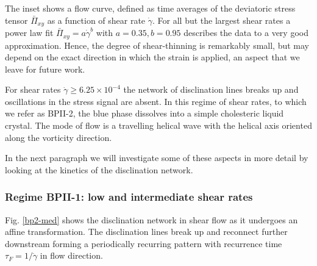 \documentclass[aps,pre,reprint,superscriptaddress, twocolumn]{revtex4}
\newcommand{\e}[1]{\times10^{#1}}
\newcommand{\gd}{\dot{\gamma}}
\begin{document}
The inset shows a flow curve, defined as time averages of 
the deviatoric stress tensor $\bar{\Pi}_{xy}$ as a function of shear rate $\gd$.
For all but the largest shear rates a power law fit $\bar{\Pi}_{xy}=a \gd^b$ with 
$a=0.35, b=0.95$ describes the data to a very good approximation. 
Hence, the degree of shear-thinning is remarkably small, but may depend
on the exact direction in which the strain is applied, an aspect that we     
leave for future work.

For shear rates $\gd\ge6.25\e{-4}$ the network of disclination lines
breaks up and oscillations in the stress signal are absent.
In this regime of shear rates, to which we refer as BPII-2, the 
blue phase dissolves into a simple cholesteric liquid 
crystal. The mode of flow is a travelling helical wave with the helical axis 
oriented along the vorticity direction.

In the next paragraph we will investigate some of these aspects in more detail 
by looking at the kinetics of the disclination network.

\subsubsection{Regime BPII-1: low and intermediate shear rates}

Fig. \ref{bp2-med} shows the disclination network in shear flow as
it undergoes an affine transformation. The disclination lines break up and 
reconnect further downstream forming a periodically recurring pattern with 
recurrence time $\tau_F=1/\gd$ in flow direction.
\end{document}
